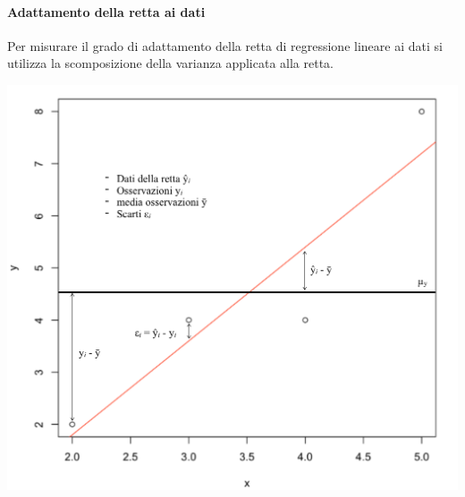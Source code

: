 \documentclass{article}
\begin{document}
        \paragraph{Adattamento della retta ai dati} Per misurare il grado di adattamento della retta di regressione lineare ai dati si utilizza la scomposizione della varianza applicata alla retta. 
               \begin{center}
                             \includegraphics[scale=0.33]{image/regressione.png}
                \end{center}
           
\end{document}
